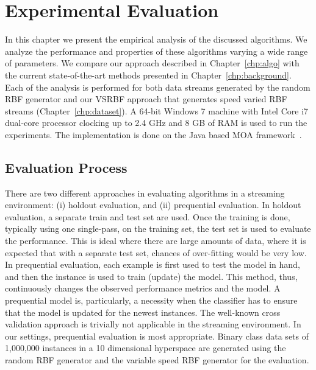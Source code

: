 \chapter{Experimental Evaluation}
\label{chp:exp}
In this chapter we present the empirical analysis of the discussed algorithms. We analyze the performance and properties of these algorithms varying a wide range of parameters. We compare our approach described in Chapter~\ref{chp:algo} with the current state-of-the-art methods presented in Chapter~\ref{chp:background}. Each of the analysis is performed for both data streams generated by the random RBF generator and our VSRBF approach that generates speed varied RBF streams (Chapter~\ref{chp:dataset}). A 64-bit Windows 7 machine with Intel Core i7 dual-core processor clocking up to 2.4 GHz and 8 GB of RAM is used to run the experiments. The implementation is done on the Java based MOA framework~\cite{bifet:moa10}. 


\section{Evaluation Process}
There are two different approaches in evaluating algorithms in a streaming environment: (i) holdout evaluation, and (ii) prequential evaluation. In holdout evaluation, a separate train and test set are used. Once the training is done, typically using one single-pass, on the training set, the test set is used to evaluate the performance. This is ideal where there are large amounts of data, where it is expected that with a separate test set, chances of over-fitting would be very low. In prequential evaluation, each example is first used to test the model in hand, and then the instance is used to train (update) the model. This method, thus, continuously changes the observed performance metrics and the model. A prequential model is, particularly, a necessity when the classifier has to ensure that the model is updated for the newest instances. The well-known cross validation approach is trivially not applicable in the streaming environment. In our settings, prequential evaluation is most appropriate. Binary class data sets of 1,000,000 instances in a 10 dimensional hyperspace are generated using the random RBF generator and the variable speed RBF generator for the evaluation. 

